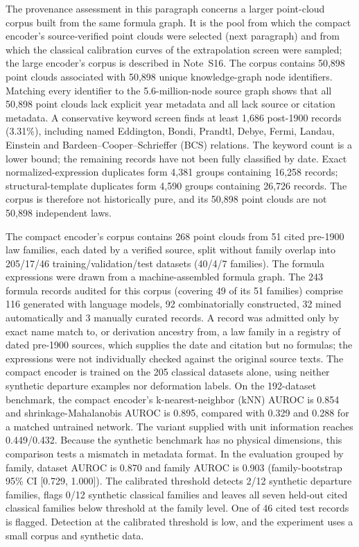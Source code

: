 \documentclass{article}
\begin{document}
The provenance assessment in this paragraph concerns a larger point-cloud corpus built from the same formula graph. It is the pool from which the compact encoder's source-verified point clouds were selected (next paragraph) and from which the classical calibration curves of the extrapolation screen were sampled; the large encoder's corpus is described in Note~S16. The corpus contains 50,898 point clouds associated with 50,898 unique knowledge-graph node identifiers. Matching every identifier to the 5.6-million-node source graph shows that all 50,898 point clouds lack explicit year metadata and all lack source or citation metadata. A conservative keyword screen finds at least 1,686 post-1900 records (3.31\%), including named Eddington, Bondi, Prandtl, Debye, Fermi, Landau, Einstein and Bardeen--Cooper--Schrieffer (BCS) relations. The keyword count is a lower bound; the remaining records have not been fully classified by date. Exact normalized-expression duplicates form 4,381 groups containing 16,258 records; structural-template duplicates form 4,590 groups containing 26,726 records. The corpus is therefore not historically pure, and its 50,898 point clouds are not 50,898 independent laws.

The compact encoder's corpus contains 268 point clouds from 51 cited pre-1900 law families, each dated by a verified source, split without family overlap into 205/17/46 training/validation/test datasets (40/4/7 families). The formula expressions were drawn from a machine-assembled formula graph. The 243 formula records audited for this corpus (covering 49 of its 51 families) comprise 116 generated with language models, 92 combinatorially constructed, 32 mined automatically and 3 manually curated records. A record was admitted only by exact name match to, or derivation ancestry from, a law family in a registry of dated pre-1900 sources, which supplies the date and citation but no formulas; the expressions were not individually checked against the original source texts. The compact encoder is trained on the 205 classical datasets alone, using neither synthetic departure examples nor deformation labels. On the 192-dataset benchmark, the compact encoder's k-nearest-neighbor (kNN) AUROC is 0.854 and shrinkage-Mahalanobis AUROC is 0.895, compared with 0.329 and 0.288 for a matched untrained network. The variant supplied with unit information reaches 0.449/0.432. Because the synthetic benchmark has no physical dimensions, this comparison tests a mismatch in metadata format. In the evaluation grouped by family, dataset AUROC is 0.870 and family AUROC is 0.903 (family-bootstrap 95\% CI [0.729, 1.000]). The calibrated threshold detects 2/12 synthetic departure families, flags 0/12 synthetic classical families and leaves all seven held-out cited classical families below threshold at the family level. One of 46 cited test records is flagged. Detection at the calibrated threshold is low, and the experiment uses a small corpus and synthetic data.
\end{document}

